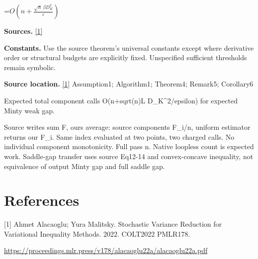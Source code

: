\documentclass[10pt,a4paper]{article}
\newcommand{\AtlasMath}[1]{\par\begingroup\centering\setbox0=\hbox{$\displaystyle #1$}\ifdim\wd0>1.4\linewidth\typeout{ATLAS WIDE FORMULA: \the\wd0}\fi\ifdim\wd0>\linewidth\resizebox{\linewidth}{!}{\box0}\else\box0\fi\par\endgroup}
\begin{document}
\AtlasMath{O\!\left(n+\frac{\sqrt n\,\beta D_K^2}{\varepsilon}\right)}
\textbf{Sources.} \href{https://proceedings.mlr.press/v178/alacaoglu22a/alacaoglu22a.pdf}{[1]}

\textbf{Constants.} Use the source theorem’s universal constants except where derivative order or structural budgets are explicitly fixed. Unspecified sufficient thresholds remain symbolic.

\textbf{Source location.} \href{https://proceedings.mlr.press/v178/alacaoglu22a/alacaoglu22a.pdf}{[1]} Assumption1; Algorithm1; Theorem4; Remark5; Corollary6

Expected total component calls O(n+sqrt(n)L D\_K\textasciicircum{}2/epsilon) for expected Minty weak gap.

Source writes sum F, ours average: source components F\_i/n, uniform estimator returns our F\_i. Same index evaluated at two points, two charged calls. No individual component monotonicity. Full pass n. Native loopless count is expected work. Saddle-gap transfer uses source Eq12-14 and convex-concave inequality, not equivalence of output Minty gap and full saddle gap.

\section{References}
[1] Ahmet Alacaoglu; Yura Malitsky. Stochastic Variance Reduction for Variational Inequality Methods. 2022. COLT2022 PMLR178.

\url{https://proceedings.mlr.press/v178/alacaoglu22a/alacaoglu22a.pdf}
\end{document}
